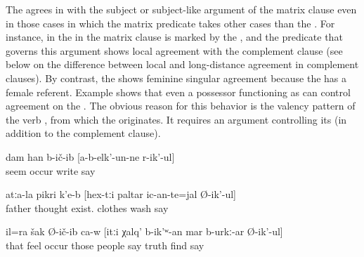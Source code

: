 The  agrees in  with the subject or subject-like argument of the matrix clause even in those cases in which the matrix predicate takes other cases than the . For instance, in  the  in the matrix clause is marked by the , and the predicate that governs this argument shows local agreement with the complement clause (see  below on the difference between local and long-distance agreement in complement clauses). By contrast, the  shows feminine singular agreement because the  has a female referent. Example  shows that even a possessor functioning as  can control  agreement on the  . The obvious reason for this behavior is the valency pattern of the verb  , from which the  originates. It requires an  argument controlling its   (in addition to the complement clause).
%
\begin{exe}
	\ex	\label{ex:‎‎‎I thought that he did not write}
	\gll	dam	han	b-ič-ib	[a-b-elk'-un-ne	r-ik'-ul]\\
			seem	occur	write	say\\
	\glt	{}

	\ex	\label{ex:‎The father thinks about whether these clothes are to be washed.}
	\gll	atːa-la	pikri	k'e-b	[hex-tːi	paltar	ic-an-te=jal	Ø-ik'-ul]\\
		father	thought	exist.		clothes	wash	say\\
	\glt	{}

	\ex	\label{ex:He also guessed that the people had probably said the truth}
	\gll	il=ra	šak	Ø-ič-ib	ca-w	[itːi	χalq'	b-ik'ʷ-an	mar	b-urkː-ar	Ø-ik'-ul]\\
		that	feel	occur		those	people	say	truth	find	say\\
	\glt	{}
\end{exe}

